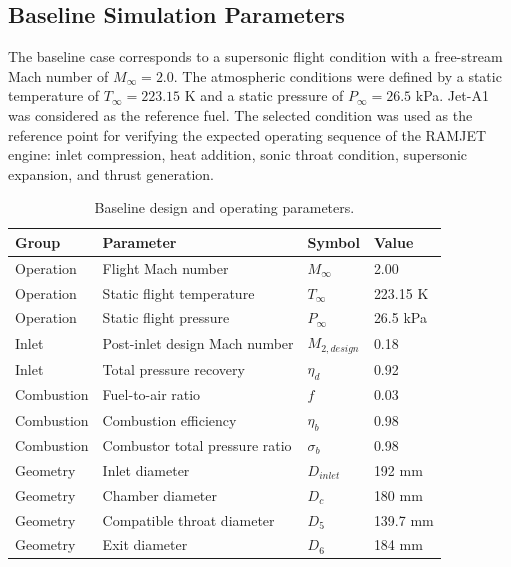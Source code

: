 \documentclass[preprint,12pt]{elsarticle}
\begin{document}
\subsection{Baseline Simulation Parameters}
The baseline case corresponds to a supersonic flight condition with a free-stream Mach number of $M_\infty=2.0$. The atmospheric conditions were defined by a static temperature of $T_\infty=223.15$ K and a static pressure of $P_\infty=26.5$ kPa. Jet-A1 was considered as the reference fuel. The selected condition was used as the reference point for verifying the expected operating sequence of the RAMJET engine: inlet compression, heat addition, sonic throat condition, supersonic expansion, and thrust generation.
\begin{table}[H]
\centering
\caption{Baseline design and operating parameters.}
\label{tab:baseline_parameters}
\begin{tabular}{llll}
\toprule
\textbf{Group} & \textbf{Parameter} & \textbf{Symbol} & \textbf{Value} \\
\midrule
Operation & Flight Mach number & $M_\infty$ & 2.00 \\
Operation & Static flight temperature & $T_\infty$ & 223.15 K \\
Operation & Static flight pressure & $P_\infty$ & 26.5 kPa \\
Inlet & Post-inlet design Mach number & $M_{2,design}$ & 0.18 \\
Inlet & Total pressure recovery & $\eta_d$ & 0.92 \\
Combustion & Fuel-to-air ratio & $f$ & 0.03 \\
Combustion & Combustion efficiency & $\eta_b$ & 0.98 \\
Combustion & Combustor total pressure ratio & $\sigma_b$ & 0.98 \\
Geometry & Inlet diameter & $D_{inlet}$ & 192 mm \\
Geometry & Chamber diameter & $D_c$ & 180 mm \\
Geometry & Compatible throat diameter & $D_5$ & 139.7 mm \\
Geometry & Exit diameter & $D_6$ & 184 mm \\
\bottomrule
\end{tabular}
\end{table}
\end{document}
